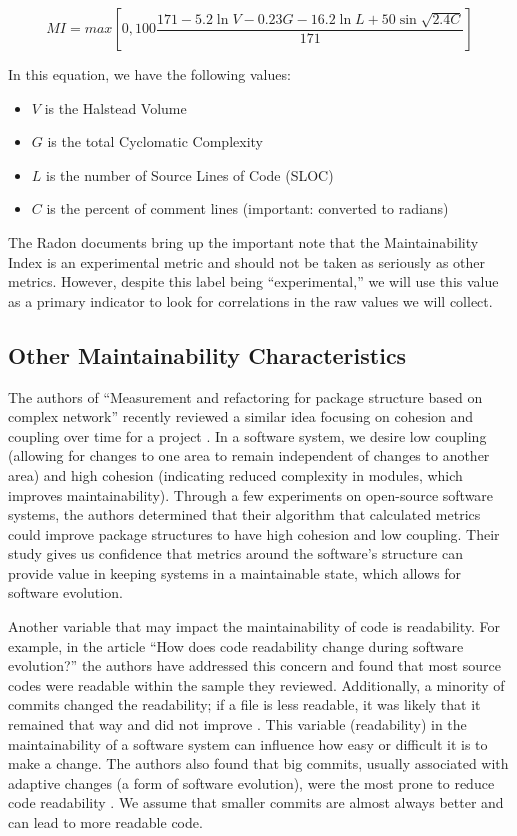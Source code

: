 $$
MI = max[0, 100\frac{171 - 5.2 \ln{V} - 0.23G - 16.2 \ln{L} + 50 \sin{\sqrt{2.4C}}}{171}]
$$

In this equation, we have the following values:
\begin{singlespace}
  \begin{itemize}
    \item $V$ is the Halstead Volume
    \item $G$ is the total Cyclomatic Complexity
    \item $L$ is the number of Source Lines of Code (SLOC)
    \item $C$ is the percent of comment lines (important: converted to radians)
  \end{itemize}    
\end{singlespace}

The Radon documents bring up the important note that the Maintainability Index is an experimental metric and should not be taken as seriously as other metrics. However, despite this label being ``experimental,'' we will use this value as a primary indicator to look for correlations in the raw values we will collect.


\subsection{Other Maintainability Characteristics} \label{subOtherCharacteristics}

The authors of ``Measurement and refactoring for package structure based on complex network'' recently reviewed a similar idea focusing on cohesion and coupling over time for a project \cite{zhou:2020}. In a software system, we desire low coupling (allowing for changes to one area to remain independent of changes to another area) and high cohesion (indicating reduced complexity in modules, which improves maintainability). Through a few experiments on open-source software systems, the authors determined that their algorithm that calculated metrics could improve package structures to have high cohesion and low coupling. Their study gives us confidence that metrics around the software's structure can provide value in keeping systems in a maintainable state, which allows for software evolution.

Another variable that may impact the maintainability of code is readability. For example, in the article ``How does code readability change during software evolution?'' the authors have addressed this concern and found that most source codes were readable within the sample they reviewed. Additionally, a minority of commits changed the readability; if a file is less readable, it was likely that it remained that way and did not improve \cite{piantadosi:2020}. This variable (readability) in the maintainability of a software system can influence how easy or difficult it is to make a change. The authors also found that big commits, usually associated with adaptive changes (a form of software evolution), were the most prone to reduce code readability \cite{piantadosi:2020}. We assume that smaller commits are almost always better and can lead to more readable code.

